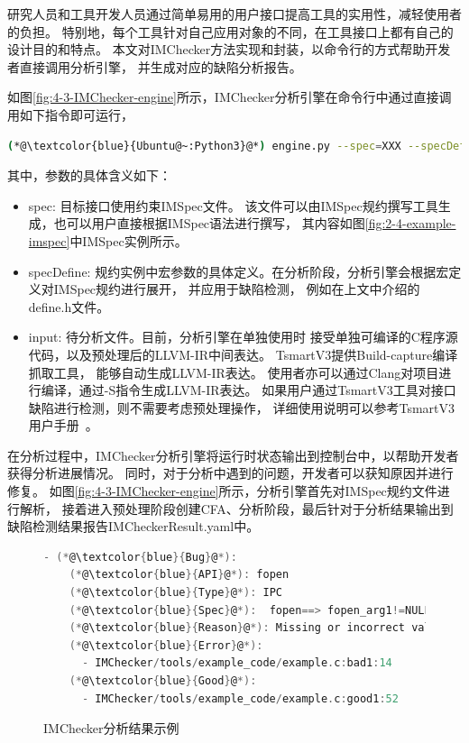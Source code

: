 研究人员和工具开发人员通过简单易用的用户接口提高工具的实用性，减轻使用者的负担。
特别地，每个工具针对自己应用对象的不同，在工具接口上都有自己的设计目的和特点。
本文对IMChecker方法实现和封装，以命令行的方式帮助开发者直接调用分析引擎，
并生成对应的缺陷分析报告。

如图\ref{fig:4-3-IMChecker-engine}所示，IMChecker分析引擎在命令行中通过直接调用如下指令即可运行，
\begin{lstlisting}[language={bash},
basicstyle=\linespread{0.8}\listingsfont,
numbers=none,
xleftmargin=.1\textwidth]
(*@\textcolor{blue}{Ubuntu@~:Python3}@*) engine.py --spec=XXX --specDefine=XXX --input=XXX
\end{lstlisting}
其中，参数的具体含义如下：
\begin{itemize}
	\item spec: 目标接口使用约束IMSpec文件。
	该文件可以由IMSpec规约撰写工具生成，也可以用户直接根据IMSpec语法进行撰写，
	其内容如图\ref{fig:2-4-example-imspec}中IMSpec实例所示。
	\item specDefine: 规约实例中宏参数的具体定义。在分析阶段，分析引擎会根据宏定义对IMSpec规约进行展开，
	并应用于缺陷检测，
	例如在上文中介绍的define.h文件。
	\item input: 待分析文件。目前，分析引擎在单独使用时
	接受单独可编译的C程序源代码，以及预处理后的LLVM-IR中间表达。
	TsmartV3提供Build-capture编译抓取工具，
	能够自动生成LLVM-IR表达。
	使用者亦可以通过Clang对项目进行编译，通过-S指令生成LLVM-IR表达。
	如果用户通过TsmartV3工具对接口缺陷进行检测，则不需要考虑预处理操作，
	详细使用说明可以参考TsmartV3用户手册~\cite{tsmart}。
\end{itemize}

在分析过程中，IMChecker分析引擎将运行时状态输出到控制台中，以帮助开发者获得分析进展情况。
同时，对于分析中遇到的问题，开发者可以获知原因并进行修复。
如图\ref{fig:4-3-IMChecker-engine}所示，分析引擎首先对IMSpec规约文件进行解析，
接着进入预处理阶段创建CFA、分析阶段，最后针对于分析结果输出到缺陷检测结果报告IMCheckerResult.yaml中。

\begin{figure}[b]
	\centering
	\begin{minipage}{0.7\linewidth}
\begin{lstlisting}[language={C},
basicstyle=\linespread{0.7}\listingsfont,
numbers=none,frame=trBL,
xleftmargin=0pt]
  - (*@\textcolor{blue}{Bug}@*):
    (*@\textcolor{blue}{API}@*): fopen
    (*@\textcolor{blue}{Type}@*): IPC
    (*@\textcolor{blue}{Spec}@*):  fopen==> fopen_arg1!=NULL
    (*@\textcolor{blue}{Reason}@*): Missing or incorrect validation of parameter
    (*@\textcolor{blue}{Error}@*): 
      - IMChecker/tools/example_code/example.c:bad1:14
    (*@\textcolor{blue}{Good}@*): 
      - IMChecker/tools/example_code/example.c:good1:52
\end{lstlisting}
	\end{minipage}
	\caption{
		IMChecker分析结果示例
	}
	\label{fig:4-3-Result}
\end{figure}

